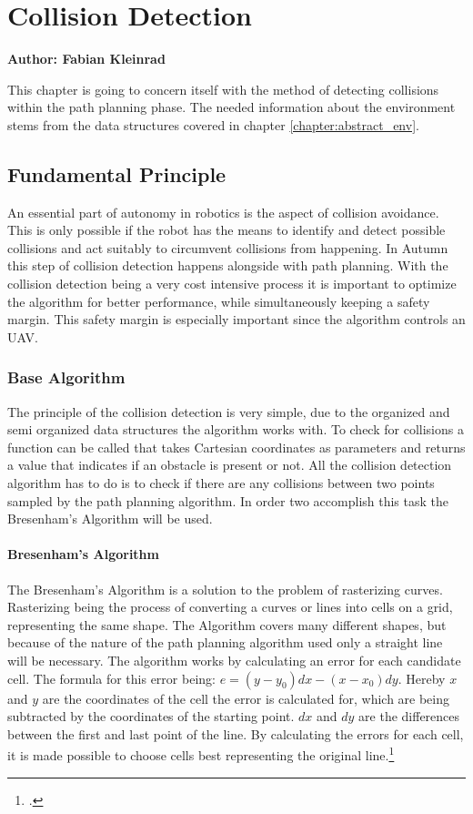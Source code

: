\chapter{Collision Detection}
\label{chapter:collision_detection}

\textbf{Author: Fabian Kleinrad} 

This chapter is going to concern itself with the method of detecting collisions within the path planning phase. The needed information about the environment stems from the data structures covered in chapter \ref{chapter:abstract_env}. 

\section{Fundamental Principle}
An essential part of autonomy in robotics is the aspect of collision avoidance. This is only possible if the robot has the means to identify and detect possible collisions and act suitably to circumvent collisions from happening.\newline
In Autumn this step of collision detection happens alongside with path planning. With the collision detection being a very cost intensive process it is important to optimize the algorithm for better performance, while simultaneously keeping a safety margin. This safety margin is especially important since the algorithm controls an UAV. 

\subsection{Base Algorithm}
The principle of the collision detection is very simple, due to the organized and semi organized data structures the algorithm works with. To check for collisions a function can be called that takes Cartesian coordinates as parameters and returns a value that indicates if an obstacle is present or not. All the collision detection algorithm has to do is to check if there are any collisions between two points sampled by the path planning algorithm. In order two accomplish this task the Bresenham's Algorithm will be used.\newline

\subsubsection{Bresenham's Algorithm} 
The Bresenham's Algorithm is a solution to the problem of rasterizing curves. Rasterizing being the process of converting a curves or lines into cells on a grid, representing the same shape. The Algorithm covers many different shapes, but because of the nature of the path planning algorithm used only a straight line will be necessary.\newline
The algorithm works by calculating an error for each candidate cell. The formula for this error being: $e=(y-y_0)dx-(x-x_0)dy$. Hereby $x$ and $y$ are the coordinates of the cell the error is calculated for, which are being subtracted by the coordinates of the starting point. $dx$ and $dy$ are the differences between the first and last point of the line. By calculating the errors for each cell, it is made possible to choose cells best representing the original line.\footcite{Zingl2012}

